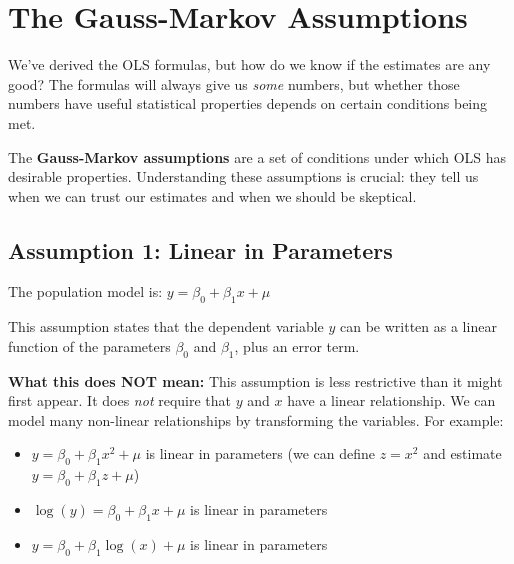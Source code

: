 \documentclass[
  letterpaper,
  DIV=11,
  numbers=noendperiod]{scrreprt}
\providecommand{\tightlist}{%
  \setlength{\itemsep}{0pt}\setlength{\parskip}{0pt}}
\begin{document}
\section{The Gauss-Markov
Assumptions}\label{the-gauss-markov-assumptions}

We've derived the OLS formulas, but how do we know if the estimates are
any good? The formulas will always give us \emph{some} numbers, but
whether those numbers have useful statistical properties depends on
certain conditions being met.

The \textbf{Gauss-Markov assumptions} are a set of conditions under
which OLS has desirable properties. Understanding these assumptions is
crucial: they tell us when we can trust our estimates and when we should
be skeptical.

\subsection{Assumption 1: Linear in
Parameters}\label{assumption-1-linear-in-parameters}

\begin{tcolorbox}[enhanced jigsaw, arc=.35mm, bottomrule=.15mm, bottomtitle=1mm, breakable, colback=white, colbacktitle=quarto-callout-note-color!10!white, colframe=quarto-callout-note-color-frame, coltitle=black, left=2mm, leftrule=.75mm, opacityback=0, opacitybacktitle=0.6, rightrule=.15mm, title=\textcolor{quarto-callout-note-color}{\faInfo}\hspace{0.5em}{Gauss-Markov Assumption 1: Linear in Parameters}, titlerule=0mm, toprule=.15mm, toptitle=1mm]

The population model is: \(y = \beta_0 + \beta_1 x + \mu\)

\end{tcolorbox}

This assumption states that the dependent variable \(y\) can be written
as a linear function of the parameters \(\beta_0\) and \(\beta_1\), plus
an error term.

\textbf{What this does NOT mean:} This assumption is less restrictive
than it might first appear. It does \emph{not} require that \(y\) and
\(x\) have a linear relationship. We can model many non-linear
relationships by transforming the variables. For example:

\begin{itemize}
\tightlist
\item
  \(y = \beta_0 + \beta_1 x^2 + \mu\) is linear in parameters (we can
  define \(z = x^2\) and estimate \(y = \beta_0 + \beta_1 z + \mu\))
\item
  \(\log(y) = \beta_0 + \beta_1 x + \mu\) is linear in parameters
\item
  \(y = \beta_0 + \beta_1 \log(x) + \mu\) is linear in parameters
\end{itemize}
\end{document}
